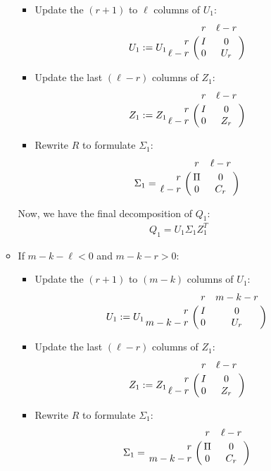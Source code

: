 \begin{enumerate}
\begin{itemize}
    \begin{itemize}
    \item Update the $(r+1)$ to $\ell$ columns of $U_{1}$:
    \begin{displaymath}
    U_{1} := U_{1}\bordermatrix{ & r & \ell-r \cr
    \hfill r & I & 0 \cr
    \hfill \ell-r & 0 & U_{r}}
    \end{displaymath}
    
    \item Update the last $(\ell-r)$ columns of $Z_{1}$:
    \begin{displaymath}
    Z_{1} := Z_{1}\bordermatrix{ & r & \ell-r \cr
    \hfill r & I & 0 \cr
    \hfill \ell-r & 0 & Z_{r}}
    \end{displaymath}
    
    \item Rewrite $R$ to formulate $\Sigma_{1}$:
    \begin{displaymath}
    \Sigma_{1} = \bordermatrix{ & r & \ell-r \cr
    \hfill r & \Pi & 0 \cr
    \hfill \ell-r & 0 & C_{r}}
    \end{displaymath}
    \end{itemize}
    
Now, we have the final decomposition of $Q_1$:
\begin{align}
Q_1 = U_{1}\Sigma_{1}Z_{1}^{T}
\end{align}

\item If $m - k - \ell < 0$ and $m - k - r > 0$:

\begin{itemize}
    \item Update the $(r+1)$ to $(m-k)$ columns of $U_{1}$:
    \begin{displaymath}
    U_{1} := U_{1}\bordermatrix{ & r & m-k-r \cr
    \hfill r & I & 0 \cr
    \hfill m-k-r & 0 & U_{r}}
    \end{displaymath}
    
    \item Update the last $(\ell-r)$ columns of $Z_{1}$:
    \begin{displaymath}
    Z_{1} := Z_{1}\bordermatrix{ & r & \ell-r \cr
    \hfill r & I & 0 \cr
    \hfill \ell-r & 0 & Z_{r}}
    \end{displaymath}
    
    \item Rewrite $R$ to formulate $\Sigma_{1}$:
    \begin{displaymath}
    \Sigma_{1} = \bordermatrix{ & r & \ell-r\cr
    \hfill r & \Pi & 0 \cr
    \hfill m-k-r & 0 & C_{r}}
    \end{displaymath}
    \end{itemize}
    

\end{itemize}
\end{enumerate}
